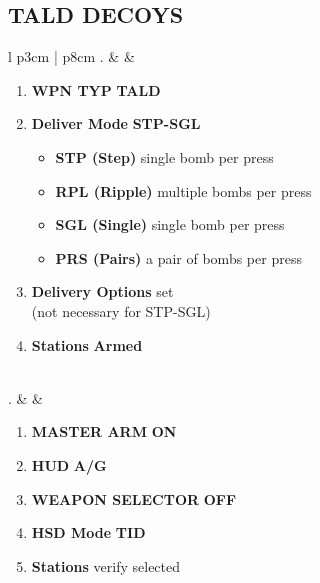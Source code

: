 \documentclass[8pt,usenames,dvipsnames,twoside]{article}
\begin{document}
		\subsection{TALD DECOYS}
		\begin{center}
			\begin{tabular}{l p{3cm} | p{8cm}}
				. &  & 
				\begin{minipage}[t]{\linewidth}
					\vspace{-7pt}
					\begin{enumerate}[label=(\alph*)]
						\item \textbf{WPN TYP} \dotfill \textbf{TALD}
						\item \textbf{Deliver Mode} \dotfill \textbf{STP-SGL}
						\begin{itemize}
							\item \textbf{STP (Step)} single bomb per press
							\item \textbf{RPL (Ripple)} multiple bombs per press
							\item \textbf{SGL (Single)} single bomb per press
							\item \textbf{PRS (Pairs)} a pair of bombs per press
						\end{itemize}
						\item \textbf{Delivery Options} \dotfill set \\
						\hfill (not necessary for STP-SGL)
						\item \textbf{Stations} \dotfill \textbf{Armed}
					\end{enumerate}
				\end{minipage} \\
				. &  & 
				\begin{minipage}[t]{\linewidth}
					\vspace{-7pt}
					\begin{enumerate}[label=(\alph*)]
						\item \textbf{MASTER ARM} \dotfill \textbf{ON}
						\item \textbf{HUD} \dotfill \textbf{A/G}
						\item \textbf{WEAPON SELECTOR} \dotfill \textbf{OFF}
						\item \textbf{HSD Mode} \dotfill \textbf{TID}
						\item \textbf{Stations} \dotfill verify selected
					\end{enumerate} 
				\end{minipage} \\

\end{tabular}
\end{center}
\end{document}
